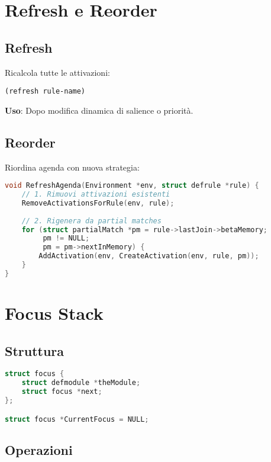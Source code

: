 \section{Refresh e Reorder}

\subsection{Refresh}

Ricalcola tutte le attivazioni:

\begin{lstlisting}[language=CLIPS]
(refresh rule-name)
\end{lstlisting}

\textbf{Uso}: Dopo modifica dinamica di salience o priorità.

\subsection{Reorder}

Riordina agenda con nuova strategia:

\begin{lstlisting}[language=C]
void RefreshAgenda(Environment *env, struct defrule *rule) {
    // 1. Rimuovi attivazioni esistenti
    RemoveActivationsForRule(env, rule);
    
    // 2. Rigenera da partial matches
    for (struct partialMatch *pm = rule->lastJoin->betaMemory;
         pm != NULL;
         pm = pm->nextInMemory) {
        AddActivation(env, CreateActivation(env, rule, pm));
    }
}
\end{lstlisting}

\section{Focus Stack}

\subsection{Struttura}

\begin{lstlisting}[language=C]
struct focus {
    struct defmodule *theModule;
    struct focus *next;
};

struct focus *CurrentFocus = NULL;
\end{lstlisting}

\subsection{Operazioni}

